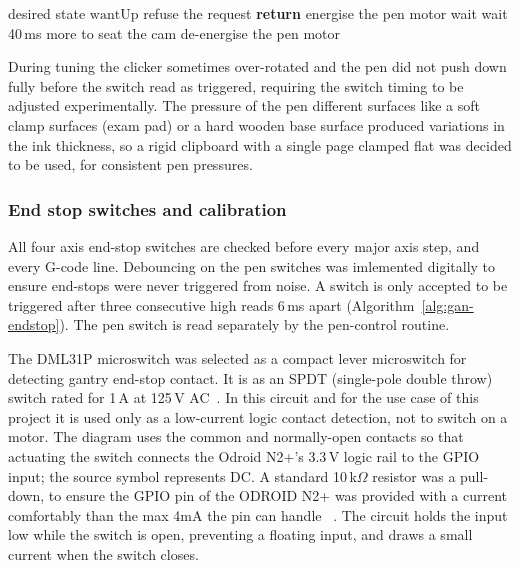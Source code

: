 \begin{algorithm}[!htbp]
\caption{Pen toggle}
\label{alg:gan-pen}
\begin{algorithmic}[1]
\REQUIRE desired state $\mathrm{wantUp}$
    \STATE refuse the request
    \STATE \textbf{return} 
\ELSE
    \STATE energise the pen motor
        \STATE wait
    \ENDWHILE
        \STATE wait 40\,ms more to seat the cam
    \ENDIF
    \STATE de-energise the pen motor
\ENDIF
\end{algorithmic}
\end{algorithm}

During tuning the clicker sometimes over-rotated and the pen did not push down fully before the switch read as triggered, requiring the switch timing to be adjusted experimentally. The pressure of the pen different surfaces like a soft clamp surfaces (exam pad) or a hard wooden base surface produced variations in the ink thickness, so a rigid clipboard with a single page clamped flat was decided to be used, for consistent pen pressures. 

\subsubsection{End stop switches and calibration}
\label{sec:des-calibration}
All four axis end-stop switches are checked before every major axis step, and every G-code line. Debouncing on the pen switches was imlemented digitally to ensure end-stops were never triggered from noise. A switch is only accepted to be triggered after three consecutive high reads 6\,ms apart (Algorithm~\ref{alg:gan-endstop}). The pen switch is read separately by the pen-control routine. 

The DML31P microswitch was selected as a compact lever microswitch for detecting gantry end-stop contact. It is as an SPDT (single-pole double throw) switch rated for 1\,A at 125\,V AC~\cite{dml31p}. In this circuit and for the use case of this project it is used only as a low-current logic contact detection, not to switch on a motor. The diagram uses the common and normally-open contacts so that actuating the switch connects the Odroid N2+'s 3.3\,V logic rail to the GPIO input; the source symbol represents DC. A standard 10\,k$\Omega$ resistor was a pull-down, to ensure the GPIO pin of the ODROID N2+ was provided with a current comfortably than the max 4mA the pin can handle ~\cite{odroidn2ds}. The circuit holds the input low while the switch is open, preventing a floating input, and draws a small current when the switch closes. 

